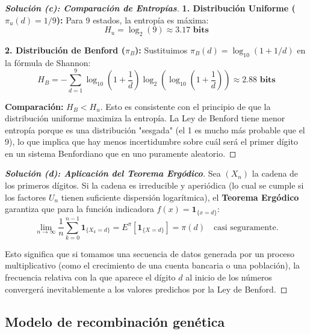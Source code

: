 \documentclass[10pt,a4paper]{article}
\begin{document}
\vspace{5mm}

\begin{proof}[\textbf{Solución (c): Comparación de Entropías}]
    \textbf{1. Distribución Uniforme ($\pi_u(d) = 1/9$):}
    Para 9 estados, la entropía es máxima:
    \[ H_u = \log_2(9) \approx \mathbf{3.17 \text{ bits}} \]
    
    \textbf{2. Distribución de Benford ($\pi_B$):}
    Sustituimos $\pi_B(d) = \log_{10}(1 + 1/d)$ en la fórmula de Shannon:
    \[ H_B = -\sum_{d=1}^9 \log_{10}\left(1 + \frac{1}{d}\right) \log_2 \left(\log_{10}\left(1 + \frac{1}{d}\right)\right) \approx \mathbf{2.88 \text{ bits}} \]
    
    \textbf{Comparación:} $H_B < H_u$. Esto es consistente con el principio de que la distribución uniforme maximiza la entropía. La Ley de Benford tiene menor entropía porque es una distribución "sesgada" (el 1 es mucho más probable que el 9), lo que implica que hay menos incertidumbre sobre cuál será el primer dígito en un sistema Benfordiano que en uno puramente aleatorio.
\end{proof}

\vspace{5mm}

\begin{proof}[\textbf{Solución (d): Aplicación del Teorema Ergódico}]
    Sea $(X_n)$ la cadena de los primeros dígitos. Si la cadena es irreducible y aperiódica (lo cual se cumple si los factores $U_n$ tienen suficiente dispersión logarítmica), el \textbf{Teorema Ergódico} garantiza que para la función indicadora $f(x) = \mathbf{1}_{\{x=d\}}$:
    \[ \lim_{n \to \infty} \frac{1}{n} \sum_{k=0}^{n-1} \mathbf{1}_{\{X_k=d\}} = E^\pi[\mathbf{1}_{\{X=d\}}] = \pi(d) \quad \text{casi seguramente.} \]
    
    Esto significa que si tomamos una secuencia de datos generada por un proceso multiplicativo (como el crecimiento de una cuenta bancaria o una población), la frecuencia relativa con la que aparece el dígito $d$ al inicio de los números convergerá inevitablemente a los valores predichos por la Ley de Benford.
\end{proof}


\newpage

\subsection{Modelo de recombinación genética}
\end{document}
